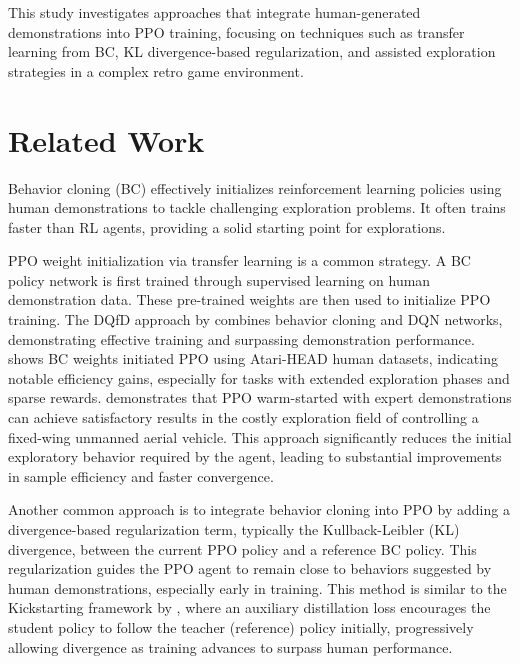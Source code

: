 \documentclass{article}
\begin{document}
This study investigates approaches that integrate human-generated 
demonstrations into PPO training, focusing on techniques such as transfer 
learning from BC, KL divergence-based regularization, and assisted exploration 
strategies in a complex retro game environment.

\section{Related Work}
Behavior cloning (BC) effectively initializes reinforcement learning 
policies using human demonstrations to tackle challenging exploration 
problems. It often trains faster than RL agents, providing a solid 
starting point for explorations.

PPO weight initialization via transfer learning is a common strategy. A BC 
policy network is first trained through supervised learning on human 
demonstration data. These pre-trained weights are then used to 
initialize PPO training. The DQfD approach by \cite{hester_dqfd_2017} 
combines behavior cloning and DQN networks, demonstrating effective 
training and surpassing demonstration performance. 
\cite{laidlaw2024bridgingrltheorypractice} shows BC weights 
initiated PPO using Atari-HEAD human datasets, indicating notable 
efficiency gains, especially for tasks with extended exploration 
phases and sparse rewards. \cite{Coletti2023EffectivenessOW} 
demonstrates that PPO warm-started with expert demonstrations can 
achieve satisfactory results in the costly exploration field of 
controlling a fixed-wing unmanned aerial vehicle. This approach 
significantly reduces the initial exploratory behavior required by 
the agent, leading to substantial improvements in sample efficiency 
and faster convergence.

Another common approach is to integrate behavior cloning into PPO by 
adding a divergence-based regularization term, typically the 
Kullback-Leibler (KL) divergence, between the current PPO policy and 
a reference BC policy. This regularization guides the PPO agent to 
remain close to behaviors suggested by human demonstrations, 
especially early in training. This method is similar to the 
Kickstarting framework by \cite{schmitt2018kickstartingdeepreinforcementlearning}, 
where an auxiliary distillation loss encourages the student policy to 
follow the teacher (reference) policy initially, progressively 
allowing divergence as training advances to surpass human performance.
\end{document}
